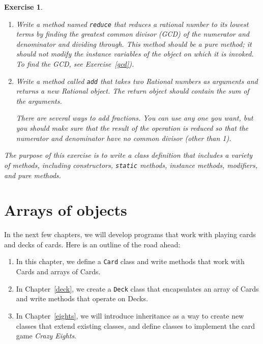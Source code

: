 \documentclass[12pt]{book}
\theoremstyle{exercise}
\newtheorem{exercise}{Exercise}[chapter]
\newcommand{\java}[1]{\verb"#1"}
\newcommand{\java}[1]{\lstinline{#1}} %
\begin{document}
\begin{exercise}
\begin{enumerate}
\item Write a method named \java{reduce} that reduces a rational number to its lowest terms by finding the greatest common divisor (GCD) of the numerator and denominator and dividing through.
This method should be a pure method; it should not modify the instance variables of the object on which it is invoked.
To find the GCD, see Exercise~\ref{gcd}).

\item Write a method called \java{add} that takes two Rational numbers as arguments and returns a new Rational object.
The return object should contain the sum of the arguments.

There are several ways to add fractions.
You can use any one you want, but you should make sure that the result of the operation is reduced so that the numerator and denominator have no common divisor (other than 1).
\end{enumerate}

The purpose of this exercise is to write a class definition that includes a variety of methods, including constructors, \java{static} methods, instance methods, modifiers, and pure methods.
\end{exercise}


\chapter{Arrays of objects}

In the next few chapters, we will develop programs that work with playing cards and decks of cards.
Here is an outline of the road ahead:

\begin{enumerate}

\item In this chapter, we define a \java{Card} class and write methods that work with Cards and arrays of Cards.

\item In Chapter~\ref{deck}, we create a \java{Deck} class that encapsulates an array of Cards and write methods that operate on Decks.

\item In Chapter~\ref{eights}, we will introduce inheritance as a way to create new classes that extend existing classes, and define classes to implement the card game {\em Crazy Eights}.

\end{enumerate}

\end{document}
